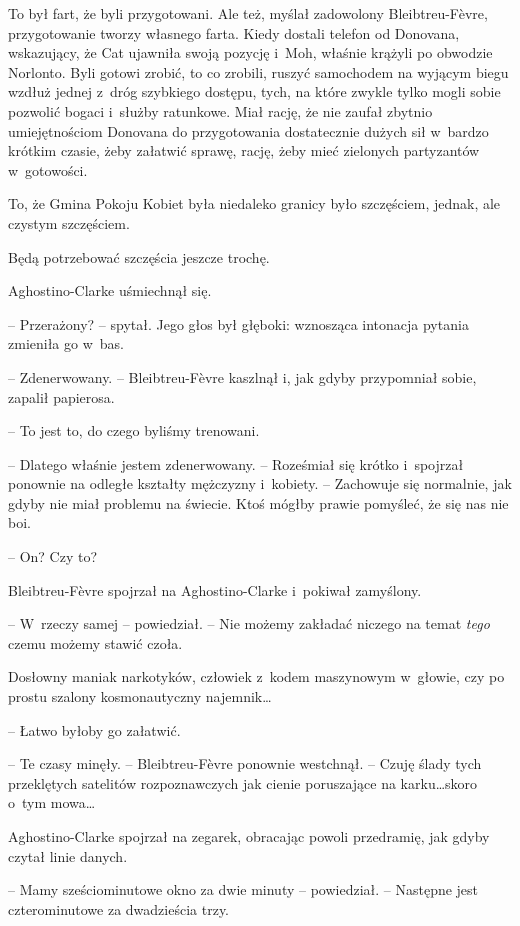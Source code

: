 \documentclass[oneside,polish,11pt,sfheadings]{mwbk}
\begin{document}
To był fart, że byli przygotowani. Ale też, myślał zadowolony
Bleibtreu-Fèvre, przygotowanie tworzy własnego farta. Kiedy dostali
telefon od Donovana, wskazujący, że Cat ujawniła swoją pozycję i~Moh,
właśnie krążyli po obwodzie Norlonto. Byli gotowi zrobić, to co zrobili,
ruszyć samochodem na wyjącym biegu wzdłuż jednej z~dróg szybkiego
dostępu, tych, na które zwykle tylko mogli sobie pozwolić bogaci i~służby ratunkowe. Miał rację, że nie zaufał zbytnio umiejętnościom
Donovana do przygotowania dostatecznie dużych sił w~bardzo krótkim
czasie, żeby załatwić sprawę, rację, żeby mieć zielonych partyzantów w~gotowości.

To, że Gmina Pokoju Kobiet była niedaleko granicy było szczęściem,
jednak, ale czystym szczęściem.

Będą potrzebować szczęścia jeszcze trochę.

Aghostino-Clarke uśmiechnął się. 

-- Przerażony? -- spytał. Jego głos był
głęboki: wznosząca intonacja pytania zmieniła go w~bas.

-- Zdenerwowany. -- Bleibtreu-Fèvre kaszlnął i, jak gdyby przypomniał
sobie, zapalił papierosa.

-- To jest to, do czego byliśmy trenowani.

-- Dlatego właśnie jestem zdenerwowany. -- Roześmiał się krótko i~spojrzał
ponownie na odległe kształty mężczyzny i~kobiety. -- Zachowuje się
normalnie, jak gdyby nie miał problemu na świecie. Ktoś mógłby prawie
pomyśleć, że się nas nie boi.

-- On? Czy to?

Bleibtreu-Fèvre spojrzał na Aghostino-Clarke i~pokiwał zamyślony. 

-- W~rzeczy samej -- powiedział. -- Nie możemy zakładać niczego na temat
\emph{tego }czemu możemy stawić czoła.

Dosłowny maniak narkotyków, człowiek z~kodem maszynowym w~głowie, czy po
prostu szalony kosmonautyczny najemnik\ldots

-- Łatwo byłoby go załatwić.

-- Te czasy minęły. -- Bleibtreu-Fèvre ponownie westchnął. -- Czuję ślady
tych przeklętych satelitów rozpoznawczych jak cienie poruszające na
karku\ldots skoro o~tym mowa\ldots

Aghostino-Clarke spojrzał na zegarek, obracając powoli przedramię, jak
gdyby czytał linie danych. 


-- Mamy sześciominutowe okno za dwie minuty -- powiedział. -- Następne jest czterominutowe za dwadzieścia trzy.
\end{document}
